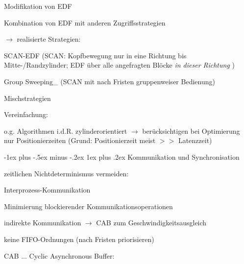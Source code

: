 \documentclass[a4paper]{article}
\makeatletter
\renewcommand{\subsubsection}{\@startsection{subsubsection}{3}{0mm}%
 {-1ex plus -.5ex minus -.2ex}%
 {1ex plus .2ex}%
 {\normalfont\small\bfseries}}
\makeatother
\begin{document}
\begin{multicols}{3}
\begin{itemize*}
\begin{enumerate*}
            \item Modifikation von EDF
            \item Kombination von EDF mit anderen Zugriffsstrategien
        \end{enumerate*}
    \end{itemize*}

    $\rightarrow$ realisierte Strategien:

    \begin{enumerate*}
        \item
        SCAN-EDF (SCAN: Kopfbewegung nur in eine Richtung bis
        Mitte-/Randzylinder; EDF über alle angefragten Blöcke \emph{in dieser
            Richtung} )
        \item
        Group Sweeping\_ (SCAN mit nach Fristen gruppenweiser Bedienung)
        \item
        Mischstrategien
    \end{enumerate*}

    \begin{itemize*}
        \item
        Vereinfachung:
        \begin{itemize*}
            \item o.g. Algorithmen i.d.R. zylinderorientiert $\rightarrow$ berücksichtigen bei Optimierung nur Positionierzeiten (Grund: Positionierzeit meist $>>$ Latenzzeit)
        \end{itemize*}
    \end{itemize*}


    \subsubsection{Kommunikation und
        Synchronisation}

    \begin{itemize*}
        \item
        zeitlichen Nichtdeterminismus vermeiden:
        \begin{enumerate*}

            \item Interprozess-Kommunikation
        \end{enumerate*}
        \begin{itemize*}
            \item Minimierung blockierender Kommunikationsoperationen
            \item indirekte Kommunikation $\rightarrow$ CAB zum Geschwindigkeitsausgleich
            \item keine FIFO-Ordnungen (nach Fristen priorisieren)
            \item CAB ... Cyclic Asynchronous Buffer: %
        \end{itemize*}
        \begin{enumerate*}


\end{enumerate*}
\end{itemize*}
\end{multicols}
\end{document}
